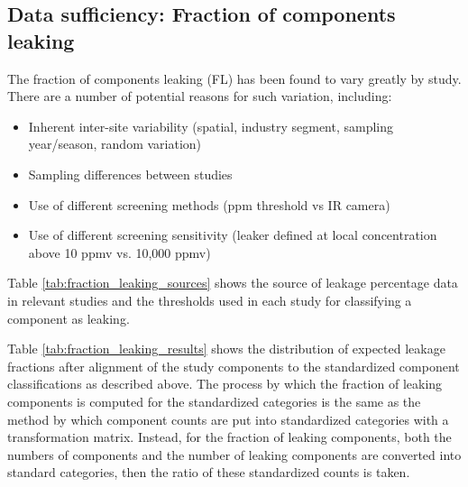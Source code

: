 \documentclass[11pt]{report}
\begin{document}
\subsection{Data sufficiency: Fraction of components leaking}

The fraction of components leaking (FL) has been found to vary greatly by study. There are a number of potential reasons for such variation, including:
\begin{itemize}
\item	Inherent inter-site variability (spatial, industry segment, sampling year/season, random variation)
\item Sampling differences between studies
\item Use of different screening methods (ppm threshold vs IR camera)
\item Use of different screening sensitivity (leaker defined at local concentration above 10 ppmv vs. 10,000 ppmv)
\end{itemize}

Table \ref{tab:fraction_leaking_sources} shows the source of leakage percentage data in relevant studies and the thresholds used in each study for classifying a component as leaking. 

Table \ref{tab:fraction_leaking_results} shows the distribution of expected leakage fractions after alignment of the study components to the standardized component classifications as described above.  The process by which the fraction of leaking components is computed for the standardized categories is the same as the method by which component counts are put into standardized categories with a transformation matrix. Instead, for the fraction of leaking components, both the numbers of components and the number of leaking components are converted into standard categories, then the ratio of these standardized counts is taken.
\end{document}
